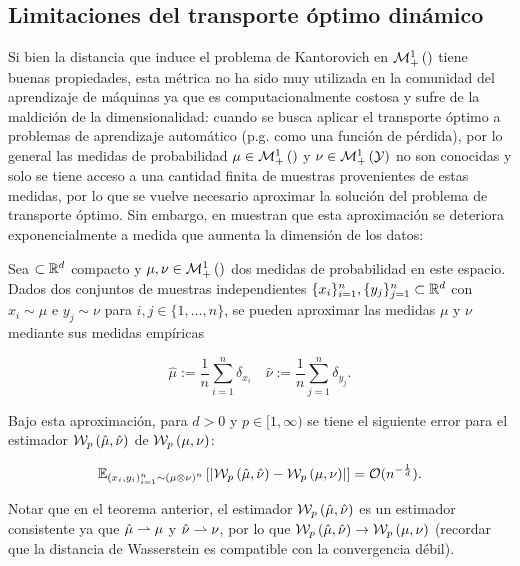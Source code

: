\subsection{Limitaciones del transporte óptimo dinámico}

Si bien la distancia que induce el problema de Kantorovich en $\mathcal{M}_+^1\left(\right)$ tiene buenas propiedades, esta métrica no ha sido muy utilizada en la comunidad del aprendizaje de máquinas ya que es computacionalmente costosa y sufre de la maldición de la dimensionalidad: cuando se busca aplicar el transporte óptimo a problemas de aprendizaje automático (p.g. como una función de pérdida), por lo general las medidas de probabilidad $\mu\in\mathcal{M}_+^1\left(\right)$ y $\nu\in\mathcal{M}_+^1\left(\mathcal{Y}\right)$ no son conocidas y solo se tiene acceso a una cantidad finita de muestras provenientes de estas medidas, por lo que se vuelve necesario aproximar la solución del problema de transporte óptimo. Sin embargo, en \cite{dudley1969} muestran que esta aproximación se deteriora exponencialmente a medida que aumenta la dimensión de los datos:

\begin{teo}[Dudley]
	Sea $\subset\mathbb{R}^d$ compacto y $\mu,\nu\in\mathcal{M}_+^1\left(\right)$ dos medidas de probabilidad en este espacio. Dados dos conjuntos de muestras independientes $\{x_i\}_{i=1}^n, \{y_j\}_{j=1}^n\subset\mathbb{R}^d$ con $x_i\sim\mu$ e $y_j\sim\nu$ para $i,j\in\{1,\ldots,n\}$, se pueden aproximar las medidas $\mu$ y $\nu$ mediante sus medidas empíricas

	\begin{equation*}
		\hat{\mu} := \frac{1}{n} \sum_{i=1}^n \delta_{x_i}
		\quad
		\hat{\nu} := \frac{1}{n} \sum_{j=1}^n \delta_{y_j} .
	\end{equation*}

	Bajo esta aproximación, para $d>0$ y $p\in[1,\infty)$ se tiene el siguiente error para el estimador $\mathcal{W}_{p}\left(\hat{\mu}, \hat{\nu}\right)$ de $\mathcal{W}_{p}\left(\mu,\nu\right)$:

	\begin{equation*}
		\mathbb{E}_{(x_i,y_i)_{i=1}^n\sim\left(\mu\otimes\nu\right)^n}\left[\left|\mathcal{W}_{p}\left(\hat{\mu}, \hat{\nu}\right) - \mathcal{W}_{p}\left(\mu,\nu\right) \right|\right] = \mathcal{O}(n^{-\frac{1}{d}}) .
	\end{equation*}
\end{teo}

Notar que en el teorema anterior, el estimador $\mathcal{W}_{p}\left(\hat{\mu}, \hat{\nu}\right)$ es un estimador consistente ya que $\hat{\mu}\rightharpoonup \mu$ y $\hat{\nu}\rightharpoonup\nu$, por lo que $\mathcal{W}_{p}\left(\hat{\mu}, \hat{\nu}\right) \to \mathcal{W}_{p}\left(\mu,\nu\right)$ (recordar que la distancia de Wasserstein es compatible con la convergencia débil).

